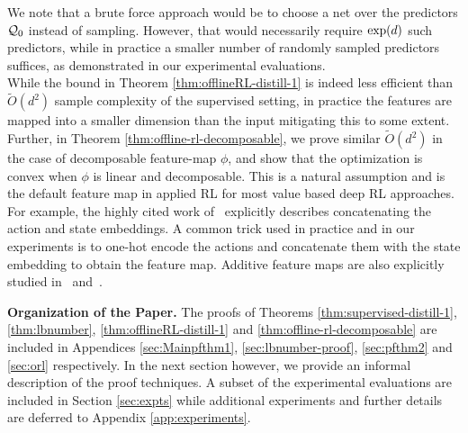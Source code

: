 We note that a brute force approach would be to choose a net over the predictors $\mathcal{Q}_0$ instead of sampling. However, that would necessarily require $\textnormal{exp}(d)$ such predictors, while in practice a smaller number of randomly sampled predictors suffices, as demonstrated in our experimental evaluations.
\\
While the bound in Theorem \ref{thm:offlineRL-distill-1} is indeed less efficient than $\tilde{O}(d^2)$ sample complexity of the supervised setting, in practice the features are mapped into a smaller dimension than the input mitigating this to some extent. Further, in Theorem \ref{thm:offline-rl-decomposable}, we prove similar $\tilde{O}(d^2)$ in the case of decomposable feature-map $\phi$, and show that the optimization is convex when $\phi$ is linear and decomposable. This is a natural assumption and is the default feature map in applied RL for most value based deep RL approaches. For example, the highly cited work of~\citep{lillicrap2016} explicitly describes concatenating the action and state embeddings. A common trick used in practice and in our experiments is to one-hot encode the actions and concatenate them with the state embedding to obtain the feature map. Additive feature maps are also explicitly studied in~\citep{zhang2020} and~\citep{yang2019}.



{\bf Organization of the Paper.} The proofs of Theorems \ref{thm:supervised-distill-1}, \ref{thm:lbnumber},  \ref{thm:offlineRL-distill-1} and \ref{thm:offline-rl-decomposable} are included in Appendices \ref{sec:Mainpfthm1}, \ref{sec:lbnumber-proof}, \ref{sec:pfthm2} and \ref{sec:orl} respectively. In the next section however, we provide an informal description of the proof techniques. A subset of the experimental evaluations are included in Section \ref{sec:expts} while additional experiments and further details are deferred to Appendix \ref{app:experiments}. 
